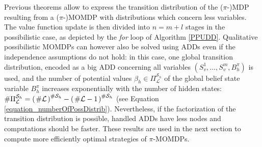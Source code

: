 Previous theorems allow to express the transition distribution
of the ($\pi$-)MDP resulting from a ($\pi$-)MOMDP
with distributions which concern less variables.
The value function update is then divided
into $n=m+l$ stages in the possibilistic case, 
as depicted by the \textit{for} loop of Algorithm \ref{PPUDD}.
Qualitative possibilistic MOMDPs
can however also be solved using ADDs
even if the independence assumptions do not hold:
in this case, one global transition distribution, 
encoded as a big ADD concerning all variables $(S^1_v,\ldots,S^m_v,B^{\pi}_h)$ 
is used, and the number of potential values $\beta_h \in \Pi^{\mathcal{S}_h}_{\mathcal{L}}$
of the global belief state variable $B^{\pi}_h$
increases exponentially with the number of hidden states: 
$\# \Pi^{\mathcal{S}_h}_{\mathcal{L}} = \left( \left. \# \mathcal{L} \right. \right)^{\# \mathcal{S}_h} - \left( \left. \# \mathcal{L} -1 \right. \right)^{\# \mathcal{S}_h}$
(see Equation \ref{equation_numberOfPossDistrib}).
Nevertheless, if the factorization of the transition distribution
is possible,
handled ADDs have less nodes
and computations should be faster.
These results are used in the next section to compute more efficiently
optimal strategies of $\pi$-MOMDPs.

